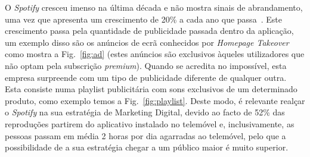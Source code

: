 \documentclass{report}
\begin{document}
O \textit{Spotify} cresceu imenso na última década e não mostra sinais de abrandamento, uma vez que apresenta um crescimento de 20\% a cada ano que passa~\cite{nicklivermore&jonboon&danfallon2000}. Este crescimento passa pela quantidade de publicidade passada dentro da aplicação, um exemplo disso são os anúncios de ecrã conhecidos por \textit{Homepage Takeover} como mostra a Fig.~\ref{fig:ad} (estes anúncios são exclusivos àqueles utilizadores que não optam pela subscrição \textit{premium}). Quando se acredita no impossível, esta empresa surpreende com um tipo de publicidade diferente de qualquer outra. Esta consiste numa playlist publicitária com sons exclusivos de um determinado produto, como exemplo temos a Fig.~\ref{fig:playlist}. Deste modo, é relevante realçar o \textit{Spotify} na sua estratégia de Marketing Digital, devido ao facto de 52\% das reproduções partirem do aplicativo instalado no telemóvel e, inclusivamente, as pessoas passam em média 2 horas por dia agarradas ao telemóvel, pelo que a possibilidade de a sua estratégia chegar a um público maior é muito superior.
%
\end{document}
